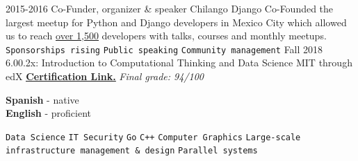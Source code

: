 \documentclass[9pt]{developercv}
\begin{document}
\begin{entrylist}
    \entry
        {2015-2016}
        {Co-Funder, organizer \& speaker}
        {Chilango Django}
        {
            Co-Founded the largest meetup for Python and Django developers in Mexico
            City which allowed us to reach
            {\href{https://meetup.com/Chilango-Django/}{\underline{over 1,500}}}
            developers with talks, courses and monthly meetups.\\
                \texttt{Sponsorships rising}\slashsep
                \texttt{Public speaking}\slashsep
                \texttt{Community management}
        }
    \entry
        {Fall 2018}
        {6.00.2x: Introduction to Computational Thinking and Data Science}
        {MIT through edX}
        {{\href{https://courses.edx.org/certificates/44a472b535354c15b494ac70b98af436}{\textbf{\underline{Certification Link.}}}} \textit{\small{Final grade: 94/100}}} \\
        
\end{entrylist}


\begin{minipage}[t]{0.3\textwidth}
    \vspace{-\baselineskip}

    
    \textbf{Spanish} - native\\
    \textbf{English} - proficient
\end{minipage}
\hfill
\begin{minipage}[t]{0.8\textwidth}
    \vspace{-\baselineskip}


    \texttt{Data Science}\slashsep
    \texttt{IT Security}\slashsep
    \texttt{Go}\slashsep
    \texttt{C++}\slashsep
    \texttt{Computer Graphics}\slashsep
    \texttt{Large-scale infrastructure management \& design}\slashsep
    \texttt{Parallel systems}
\end{minipage}

\end{document}
